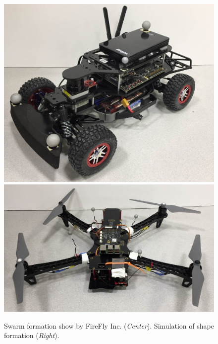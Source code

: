 \begin{figure}[h!]
\begin{minipage}{0.55\columnwidth}
	\includegraphics[width=0.42\linewidth]{figs/car.jpg}
	\includegraphics[width=0.56\linewidth]{figs/quad.jpg}
\end{minipage}%
	\caption{Swarm formation show by FireFly Inc. (\emph{Center}). Simulation of shape formation (\emph{Right}).}
    \label{fig:firefly}
\end{figure}


